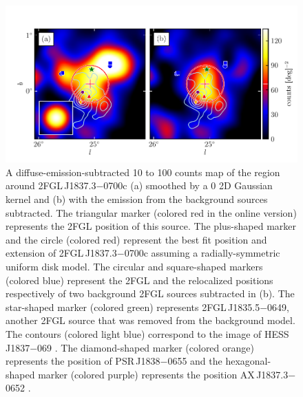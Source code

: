 \begin{figure}[htbp]
  \includegraphics{source_plots/source_HESS_J1837-069_color.pdf}
  \caption{A diffuse-emission-subtracted 10 \gev to 100 \gev counts map
  of the region around 2FGL\,J1837.3$-$0700c (a) smoothed by a 0
  2D Gaussian kernel and (b) with the emission from the background
  sources subtracted.  The triangular marker (colored red in the online
  version) represents the 2FGL position of this source.  The plus-shaped
  marker and the circle (colored red) represent the best fit position
  and extension of 2FGL\,J1837.3$-$0700c assuming a radially-symmetric
  uniform disk model.  The circular and square-shaped markers (colored
  blue) represent the 2FGL and the relocalized positions respectively
  of two background 2FGL sources subtracted in (b).  The star-shaped
  marker (colored green) represents 2FGL\,J1835.5$-$0649, another 2FGL
  source that was removed from the background model.  The contours
  (colored light blue) correspond to the \tev image of HESS\,J1837$-$069
  \citep{aharonian_2006a_h.e.s.s.-survey}.  The diamond-shaped marker
  (colored orange) represents the position of PSR\,J1838$-$0655 and
  the hexagonal-shaped marker (colored purple) represents the position
  AX\,J1837.3$-$0652 \citep{gotthelf_2008a_discovery-young}.}
\end{figure}

